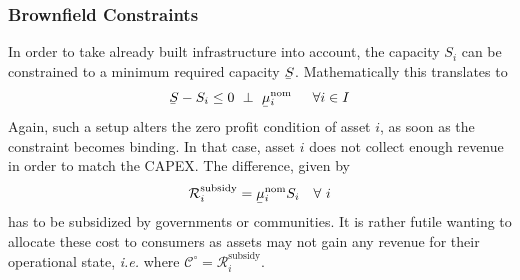 \documentclass[11pt,twocolumn]{article}
\newcommand{\ie}{\textit{i.e.} }
\newcommand{\ubar}[1]{\underaccent{\bar}{#1}}
\newcommand{\hpad}{\hspace{15pt}}
\newcommand{\resultsin}[1]{\hspace{6pt} \bot  \hspace{6pt} #1}
\newcommand{\Forall}[1]{\hspace{10pt} \forall \,\, #1 }
\newcommand{\state}{s_{i,t}}
\newcommand{\capacity}{S_{i}}
\newcommand{\costfactor}{\gamma^\circ_{i,t}}
\newcommand{\capacitylower}{\ubar{S}}
\newcommand{\muuppernom}{\bar{\mu}^\text{nom}_{i}}
\newcommand{\mulowernom}{\ubar{\mu}^\text{nom}_{i}}
\newcommand{\muuppergenerationnom}{\bar{\mu}^\text{nom}_{s}}
\newcommand{\cost}[1][\circ]{\mathcal{C}^{#1}}
\newcommand{\remainingcost}{\mathcal{R}}
\newcommand{\subsidycost}{\remainingcost^\text{subsidy}}
\begin{document}


\subsubsection{Brownfield Constraints}

In order to take already built infrastructure into account, the capacity $\capacity$ can be constrained to a minimum required capacity $\capacitylower$. Mathematically this translates to 
\begin{align}
    \capacitylower - \capacity  \le 0 \resultsin{\mulowernom} \hpad \forall{i \in I}
\label{eq:capacityexpansionminimum}
\end{align}
Again, such a setup alters the zero profit condition of asset $i$, as soon as the constraint becomes binding. 
In that case, asset $i$ does not collect enough revenue in order to match the CAPEX. The difference, given by 
\begin{align}
    \subsidycost_i = \mulowernom \capacity
    \Forall{i}
\end{align}
has to be subsidized by governments or communities. It is rather futile wanting to allocate these cost to consumers as assets may not gain any revenue for their operational state, \ie where $\cost = \subsidycost_i $. 




\end{document}
